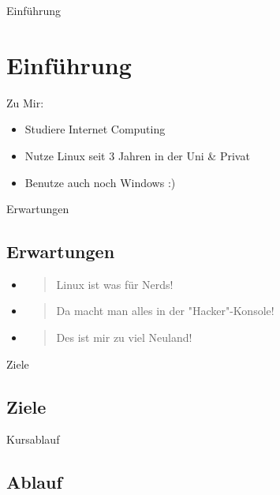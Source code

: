 
\begin{frame}{Einführung}
    \section{Einführung}\label{sec:einfuhrung}

    Zu Mir:

    \begin{itemize}
        \item Studiere Internet Computing
        \item Nutze Linux seit 3 Jahren in der Uni \& Privat
        \item Benutze auch noch Windows :)
    \end{itemize}

\end{frame}

\begin{frame}{Erwartungen}
    \subsection{Erwartungen}\label{subsec:erwartungen}

    \begin{itemize}
        \item \begin{quote}
                  Linux ist was für Nerds!
        \end{quote}
        \item \begin{quote}
                  Da macht man alles in der "Hacker"-Konsole!
        \end{quote}
        \item \begin{quote}
                  Des ist mir zu viel Neuland!
        \end{quote}
    \end{itemize}

\end{frame}

\begin{frame}{Ziele}
    \subsection{Ziele}\label{subsec:ziele}


\end{frame}

\begin{frame}{Kursablauf}
    \subsection{Ablauf}\label{subsec:ablauf}

\end{frame}